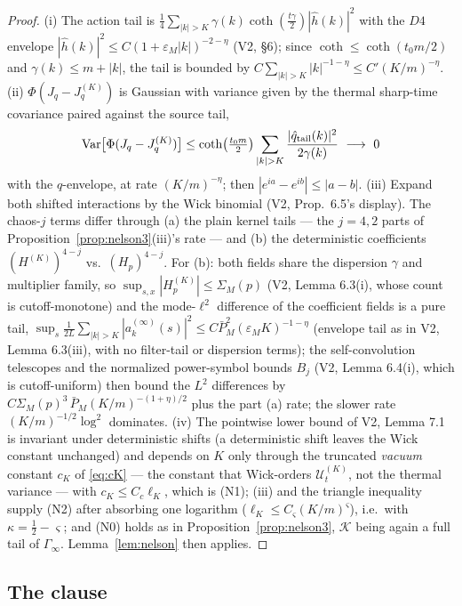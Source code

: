 \documentclass[11pt,a4paper]{article}
\theoremstyle{plain}
\theoremstyle{definition}
\newcommand{\eps}{\varepsilon}
\newcommand{\U}{\mathcal U}
\DeclareMathOperator{\cth}{coth}
\begin{document}
\begin{proof}
(i) The action tail is
$\tfrac14\sum_{|k|>K}\gamma(k)\cth(\tfrac{t\gamma}2)|\hat h(k)|^2$ with
the $D4$ envelope $|\hat h(k)|^2\le C(1+\eps_M|k|)^{-2-\eta}$ (V2, \S6);
since $\cth\le\cth(t_0m/2)$ and $\gamma(k)\le m+|k|$, the tail is
bounded by $C\sum_{|k|>K}|k|^{-1-\eta}\le C'(K/m)^{-\eta}$.
(ii) $\Phi(J_q-J^{(K)}_q)$ is Gaussian with variance given by the
thermal sharp-time covariance paired against the source tail,
\[
 \mathrm{Var}\bigl[\Phi(J_q-J^{(K)}_q)\bigr]
 \le\cth\bigl(\tfrac{t_0m}2\bigr)\sum_{|k|>K}\frac{|\hat
 q_{\rm tail}(k)|^2}{2\gamma(k)}\ \longrightarrow\ 0
\]
with the $q$-envelope, at rate $(K/m)^{-\eta}$; then
$|e^{ia}-e^{ib}|\le|a-b|$.
(iii) Expand both shifted interactions by the Wick binomial (V2,
Prop.\ 6.5's display). The chaos-$j$ terms differ through (a) the plain
kernel tails --- the $j=4,2$ parts of
Proposition~\ref{prop:nelson3}(iii)'s rate --- and (b) the deterministic
coefficients $(H^{(K)})^{4-j}$ vs.\ $(H_p)^{4-j}$. For (b): both fields
share the dispersion $\gamma$ and multiplier family, so
$\sup_{s,x}|H^{(K)}_p|\le\Sigma_M(p)$ (V2, Lemma 6.3(i), whose count is
cutoff-monotone) and the mode-$\ell^2$ difference of the coefficient
fields is a pure tail,
$\sup_s\tfrac1{2L}\sum_{|k|>K}|a^{(\infty)}_k(s)|^2\le
C\bar P_M^2(\eps_MK)^{-1-\eta}$ (envelope tail as in V2, Lemma
6.3(iii), with no filter-tail or dispersion terms); the self-convolution
telescopes and the normalized power-symbol bounds $B_j$ (V2, Lemma 6.4(i),
which is cutoff-uniform) then bound the $L^2$ differences by
$C\Sigma_M(p)^{3}\,\bar P_M(K/m)^{-(1+\eta)/2}$ plus the part (a) rate;
the slower rate $(K/m)^{-1/2}\log^2$ dominates.
(iv) The pointwise lower bound of V2, Lemma 7.1 is invariant under
deterministic shifts (a deterministic shift leaves the Wick constant unchanged)
and depends on $K$ only through the truncated \emph{vacuum} constant $c_K$ of
\eqref{eq:cK} --- the constant that Wick-orders $\U^{(K)}_t$, not the thermal
variance --- with $c_K\le C_c\ell_K$, which is (N1); (iii) and the triangle inequality supply
(N2) after absorbing one logarithm ($\ell_K\le C_\varsigma(K/m)^\varsigma$),
i.e.\ with $\kappa=\tfrac12-\varsigma$; and (N0) holds as in
Proposition~\ref{prop:nelson3}, $\mathcal K$ being again a full tail of
$\Gamma_\infty$. Lemma~\ref{lem:nelson} then applies.
\end{proof}

\subsection{The clause}
\end{document}
